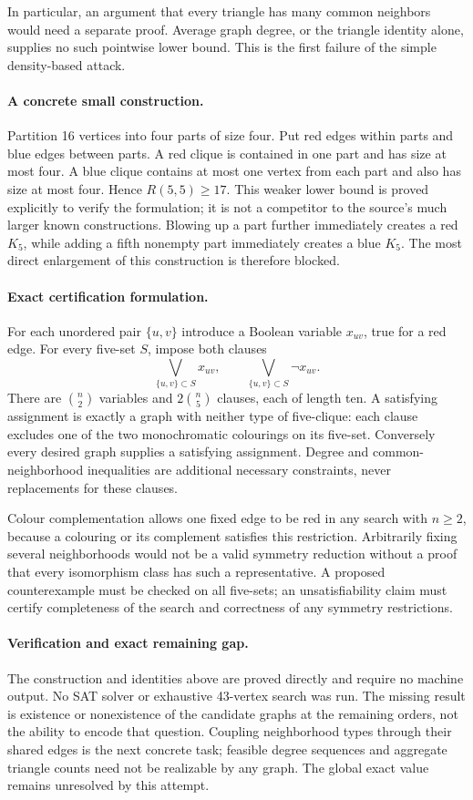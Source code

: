 \documentclass[11pt,a4paper]{article}
\begin{document}
In particular, an argument that every triangle has many common neighbors would need a separate proof. Average graph degree, or the triangle identity alone, supplies no such pointwise lower bound. This is the first failure of the simple density-based attack.

\paragraph{A concrete small construction.}
Partition 16 vertices into four parts of size four. Put red edges within parts and blue edges between parts. A red clique is contained in one part and has size at most four. A blue clique contains at most one vertex from each part and also has size at most four. Hence $R(5,5)\ge17$. This weaker lower bound is proved explicitly to verify the formulation; it is not a competitor to the source's much larger known constructions. Blowing up a part further immediately creates a red $K_5$, while adding a fifth nonempty part immediately creates a blue $K_5$. The most direct enlargement of this construction is therefore blocked.

\paragraph{Exact certification formulation.}
For each unordered pair $\{u,v\}$ introduce a Boolean variable $x_{uv}$, true for a red edge. For every five-set $S$, impose both clauses
\[
\bigvee_{\{u,v\}\subset S} x_{uv},\qquad
\bigvee_{\{u,v\}\subset S}\neg x_{uv}.
\]
There are $\binom n2$ variables and $2\binom n5$ clauses, each of length ten. A satisfying assignment is exactly a graph with neither type of five-clique: each clause excludes one of the two monochromatic colourings on its five-set. Conversely every desired graph supplies a satisfying assignment. Degree and common-neighborhood inequalities are additional necessary constraints, never replacements for these clauses.

Colour complementation allows one fixed edge to be red in any search with $n\ge2$, because a colouring or its complement satisfies this restriction. Arbitrarily fixing several neighborhoods would not be a valid symmetry reduction without a proof that every isomorphism class has such a representative. A proposed counterexample must be checked on all five-sets; an unsatisfiability claim must certify completeness of the search and correctness of any symmetry restrictions.

\paragraph{Verification and exact remaining gap.}
The construction and identities above are proved directly and require no machine output. No SAT solver or exhaustive 43-vertex search was run. The missing result is existence or nonexistence of the candidate graphs at the remaining orders, not the ability to encode that question. Coupling neighborhood types through their shared edges is the next concrete task; feasible degree sequences and aggregate triangle counts need not be realizable by any graph. The global exact value remains unresolved by this attempt.
\end{document}
